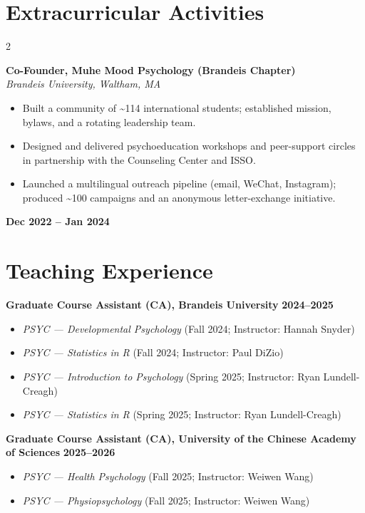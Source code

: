 \documentclass[10pt, letterpaper]{article}
\newenvironment{expitems}{
    \begin{itemize}[
        leftmargin=8pt,
        itemsep=1pt,
        topsep=2pt,
        parsep=0pt,
        partopsep=0pt
    ]
}{\end{itemize}}
\newenvironment{twocolentry}[2][]{
    \onecolentry
    \def\secondColumn{#2}
    \setcolumnwidth{\fill, 4.5 cm}
    \begin{paracol}{2}
}{
    \switchcolumn \raggedleft \secondColumn
    \end{paracol}
    \endonecolentry
} %
\begin{document}
\section*{Extracurricular Activities}
\begin{twocolentry}{\textbf{Dec 2022 – Jan 2024}}
\textbf{Co-Founder, Muhe Mood Psychology (Brandeis Chapter)}\\
\textit{Brandeis University, Waltham, MA}\\[1pt]
\begin{itemize}[leftmargin=8pt, itemsep=1pt, topsep=2pt, parsep=0pt]
  \item Built a community of \textasciitilde114 international students; established mission, bylaws, and a rotating leadership team.
  \item Designed and delivered psychoeducation workshops and peer-support circles in partnership with the Counseling Center and ISSO.
  \item Launched a multilingual outreach pipeline (email, WeChat, Instagram); produced \textasciitilde100 campaigns and an anonymous letter-exchange initiative.
\end{itemize}

\end{twocolentry}

\vspace{4pt}
\section*{Teaching Experience}

\textbf{Graduate Course Assistant (CA), Brandeis University} \hfill \textbf{2024--2025}

\begin{expitems}
  \item \textit{PSYC — Developmental Psychology} (Fall 2024; Instructor: Hannah Snyder)
  \item \textit{PSYC — Statistics in R} (Fall 2024; Instructor: Paul DiZio)
  \item \textit{PSYC — Introduction to Psychology} (Spring 2025; Instructor: Ryan Lundell-Creagh)
  \item \textit{PSYC — Statistics in R} (Spring 2025; Instructor: Ryan Lundell-Creagh)
\end{expitems}

\textbf{Graduate Course Assistant (CA), University of the Chinese Academy of Sciences} \hfill \textbf{2025--2026}

\begin{expitems}
\item \textit{PSYC — Health Psychology} (Fall 2025; Instructor: Weiwen Wang)


\item \textit{PSYC — Physiopsychology
} (Fall 2025; Instructor: Weiwen Wang)


\end{expitems}
\end{document}
